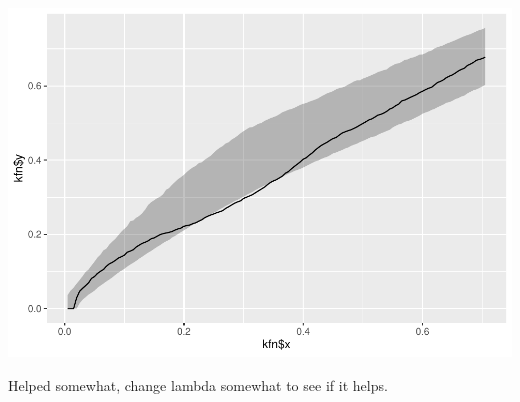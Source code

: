 \documentclass[
]{article}
\begin{document}
\includegraphics{project2_files/figure-latex/unnamed-chunk-14-1.pdf}

Helped somewhat, change lambda somewhat to see if it helps.
\end{document}
